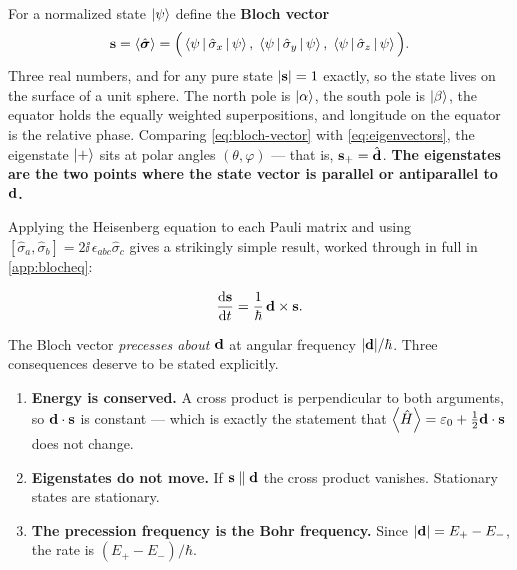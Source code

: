 For a normalized state $\ket{\psi}$ define the \textbf{Bloch vector}
%
\begin{equation}
\mathbf{s} = \Braket{\hat{\bm{\sigma}}}
      = \Big(\Braket{\psi|\hat{\sigma}_x|\psi},\;\Braket{\psi|\hat{\sigma}_y|\psi},\;\Braket{\psi|\hat{\sigma}_z|\psi}\Big).
\label{eq:bloch-vector}
\end{equation}
%
Three real numbers, and for any pure state $|\mathbf{s}| = 1$ exactly, so the state lives on
the surface of a unit sphere. The north pole is $\ket{\alpha}$, the south pole is
$\ket{\beta}$, the equator holds the equally weighted superpositions, and longitude on
the equator is the relative phase. Comparing \cref{eq:bloch-vector} with
\cref{eq:eigenvectors}, the eigenstate $\ket{+}$ sits at polar angles $(\theta,\varphi)$
--- that is, $\mathbf{s}_+ = \hat{\mathbf{d}}$. \textbf{The eigenstates are the two points where the
state vector is parallel or antiparallel to $\mathbf{d}$.}

Applying the Heisenberg equation to each Pauli matrix and using
$[\hat\sigma_a,\hat\sigma_b]=2\ii\,\epsilon_{abc}\hat\sigma_c$ gives a strikingly simple
result, worked through in full in \cref{app:blocheq}:

\begin{keyresult}
\vspace{-0.35cm}
\begin{equation}
\frac{\mathrm{d}\mathbf{s}}{\mathrm{d} t} = \frac{1}{\hbar}\,\mathbf{d}\times\mathbf{s} .
\label{eq:bloch-eq}
\end{equation}
\end{keyresult}

\noindent
The Bloch vector \emph{precesses about $\mathbf{d}$} at angular frequency $|\mathbf{d}|/\hbar$.
Three consequences deserve to be stated explicitly.

\begin{enumerate}[leftmargin=*,itemsep=2pt]
\item \textbf{Energy is conserved.} A cross product is perpendicular to both arguments,
so $\mathbf{d}\cdot\mathbf{s}$ is constant --- which is exactly the statement that
$\Braket{\hat{H}} = \varepsilon_0 + \tfrac{1}{2}\mathbf{d}\cdot\mathbf{s}$ does not change.

\item \textbf{Eigenstates do not move.} If $\mathbf{s} \parallel \mathbf{d}$ the cross product
vanishes. Stationary states are stationary.

\item \textbf{The precession frequency is the Bohr frequency.} Since
$|\mathbf{d}| = E_+-E_-$, the rate is $(E_+-E_-)/\hbar$.
\end{enumerate}

